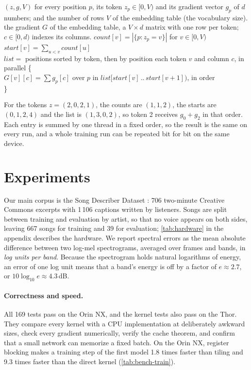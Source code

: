 \begin{procedure}{$(z, g, V)$}
{for every position $p$, its token $z_p \in [0, V)$ and its gradient vector
$g_p$ of $d$ numbers; and the number of rows $V$ of the embedding table (the
vocabulary size).}
{the gradient $G$ of the embedding table, a $V \times d$ matrix with one row
per token; $c \in [0, d)$ indexes its columns.}
\li $\mathit{count}[v] = |\{p : z_p = v\}|$ for $v \in [0, V)$  \\
\li $\mathit{start}[v] = \sum_{u < v} \mathit{count}[u]$ \\
\li $\mathit{list} = $ positions sorted by token, then by position \groupend
\li {} each token $v$ and column $c$, in parallel \{  \\
\li \> $G[v][c] = \sum g_p[c]$ over $p$ in $\mathit{list}[\mathit{start}[v] \,..\, \mathit{start}[v+1])$, in order \\
\li \}
\end{procedure}

For the tokens $z = (2, 0, 2, 1)$, the counts are $(1, 1, 2)$, the starts are
$(0, 1, 2, 4)$ and the list is $(1, 3, 0, 2)$, so token 2 receives $g_0 + g_2$ in
that order. Each entry is summed by one thread in a fixed order, so the result
is the same on every run, and a whole training run can be repeated bit for
bit on the same device.

\section{Experiments}
\label{sec:experiments}

Our main corpus is the Song Describer Dataset \cite{manco2023songdescriber}:
706 two-minute Creative Commons excerpts with 1\,106 captions written by
listeners. Songs are split between training and evaluation by artist, so that
no voice appears on both sides, leaving 667 songs for training and 39 for
evaluation; \cref{tab:hardware} in the appendix describes the hardware. We report spectral errors as the mean absolute difference
between two log-mel spectrograms, averaged over frames and bands, in
\emph{log units per band}. Because the spectrogram holds natural logarithms of
energy, an error of one log unit means that a band's energy is off by a factor
of $e \approx 2.7$, or $10 \log_{10} e \approx 4.3$\,dB.

\paragraph{Correctness and speed.} All 169 tests pass on the Orin NX, and the
kernel tests also pass on the Thor. They compare every kernel with a CPU
implementation at deliberately awkward sizes, check every gradient
numerically, verify the cache theorem, and confirm that a small network can
memorize a fixed batch. On the Orin NX, register blocking makes a training
step of the first model 1.8 times faster than tiling and 9.3 times faster than
the direct kernel (\cref{tab:bench-train}).

